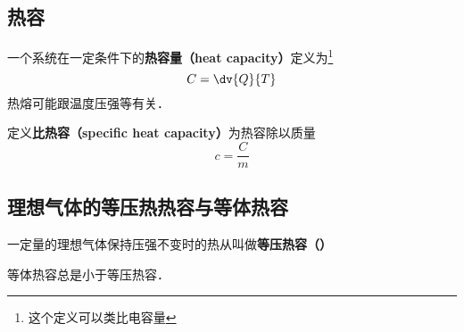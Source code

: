 
\subsection{热容}
一个系统在一定条件下的\textbf{热容量（heat capacity）}定义为\footnote{这个定义可以类比电容量}
\begin{equation}
C = \dv{Q}{T}
\end{equation}
热熔可能跟温度压强等有关．

定义\textbf{比热容（specific heat capacity）}为热容除以质量
\begin{equation}
c = \frac{C}{m}
\end{equation}

\subsection{理想气体的等压热热容与等体热容}

一定量的理想气体保持压强不变时的热从叫做\textbf{等压热容（）}

等体热容总是小于等压热容．

